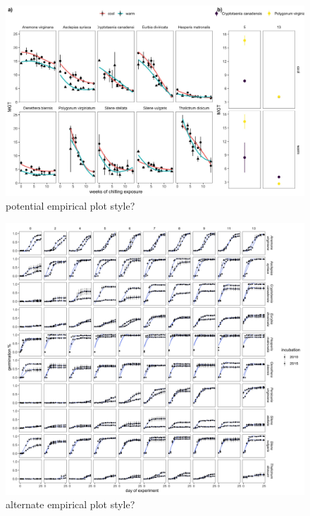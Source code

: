 \documentclass{article}
\begin{document}


\begin{figure}[h!]
  \centering
 \includegraphics[width=\textwidth]{..//plots/empricalplots2.jpeg}
    \caption{potential empirical plot style?}
    \label{Fig:emp}
\end{figure}

\begin{figure}[h!]
  \centering
 \includegraphics[width=\textwidth]{..//plots/germ_courses.jpeg}
    \caption{alternate empirical plot style?}
    \label{Fig:emp2}
\end{figure}
\end{document}
